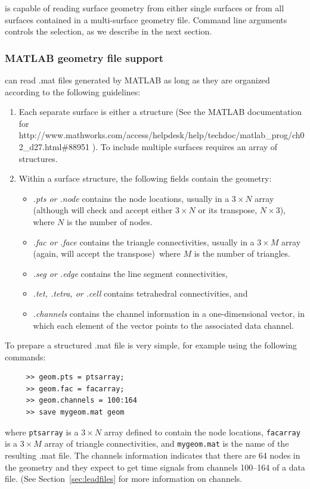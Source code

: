 \map{} is capable of reading surface geometry from either single surfaces
or from all surfaces contained in a multi-surface geometry file. 
Command line arguments controls the selection, as we describe in the next
section.

\subsubsection{MATLAB geometry file support}
\label{sec:matlabgeom}

\map{} can read .mat files generated by MATLAB as long as they are
organized according to the following guidelines:
\begin{enumerate}
  \item Each separate surface is either a structure (See 
    the MATLAB documentation for 
    {http://www.mathworks.com/access/helpdesk/help/techdoc/matlab\_prog/ch02\_d27.html\#88951}
     ).  To include multiple surfaces requires an array of
    structures.
  \item Within a surface structure, the following fields contain the
    geometry:
    \begin{itemize}
      \item \emph{.pts or .node} contains the node locations, usually in a
        $3 \times N$ array (although \map{} will check and accept either $3
        \times N$ or its transpose, $N \times 3$), where $N$ is the number
        of nodes.
      \item \emph{.fac or .face} contains the triangle connectivities,
        usually in a $3 \times M$ array (again, \map{} will accept the
        transpose)\, where $M$ is the number of triangles.
      \item \emph{.seg or .edge} contains the line segment connectivities,
      \item \emph{.tet, .tetra, or .cell} contains tetrahedral
        connectivities, and
      \item \emph{.channels} contains the channel information in a
        one-dimensional vector, in which each element of the vector points
        to the associated data channel.
    \end{itemize}
\end{enumerate}

To prepare a structured .mat file is very simple, for example using the
following commands:
%
\begin{verbatim}
     >> geom.pts = ptsarray;
     >> geom.fac = facarray;
     >> geom.channels = 100:164
     >> save mygeom.mat geom
\end{verbatim}
%
where \verb|ptsarray| is a $3 \times N$ array defined to contain the node
locations, \verb|facarray| is a $3 \times M$ array of triangle
connectivities, and \verb|mygeom.mat| is the name of the resulting .mat
file.   The channels information indicates that there are 64 nodes in the
geometry and they expect to get time signals from channels 100--164 of a
data file.  (See Section~\ref{sec:leadfiles} for more information on
channels. 

